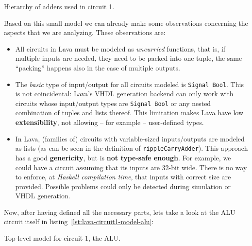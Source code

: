             \begin{listing}[h!]
                \caption{Hierarchy of adders used in circuit 1.
                    \label{lst:lava-circuit1-model-adders}}
            \end{listing}

            Based on this small model we can already make some observations concerning the aspects
            that we are analyzing. These observations are:

            \begin{itemize}
                \item All circuits in Lava must be modeled as \emph{uncurried} functions, that is,
                    if multiple inputs are needed, they need to be packed into one tuple, the same
                    ``packing'' happens also in the case of multiple outputs.

                \item The \emph{basic} type of input/output for all circuits modeled is
                    \texttt{Signal Bool}. This is not coincidental: Lava's VHDL generation backend
                    can only work with circuits whose input/output types are \texttt{Signal Bool} or
                    any nested combination of tuples and lists thereof.  This limitation makes Lava
                    have low \textbf{extensibility}, not allowing -- for example -- user-defined
                    types.

                \item In Lava, (families of) circuits with variable-sized inputs/outputs are modeled
                    as lists (as can be seen in the definition of \texttt{rippleCarryAdder}). This
                    approach has a good \textbf{genericity}, but is \textbf{not type-safe enough}.
                    For example, we could have a circuit assuming that its inputs are 32-bit wide.
                    There is no way to enforce, at \emph{Haskell compilation time}, that inputs with
                    correct size are provided.  Possible problems could only be detected during
                    simulation or VHDL generation.
            \end{itemize}

            Now, after having defined all the necessary parts, lets take a look at the ALU circuit
            itself in listing~\ref{lst:lava-circuit1-model-alu}:

            \begin{listing}[h!]
                \caption{Top-level model for circuit 1, the ALU.
                    \label{lst:lava-circuit1-model-alu}}
            \end{listing}

